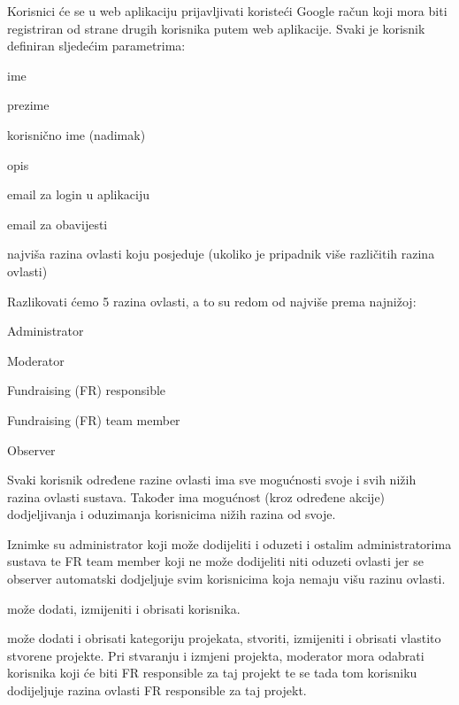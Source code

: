 		{Korisnici će se u web aplikaciju prijavljivati koristeći Google račun koji mora biti registriran od strane drugih korisnika putem web aplikacije. Svaki je korisnik definiran sljedećim parametrima:}
		\begin{packed_item}
			\item {ime}
			\item {prezime}
			\item {korisnično ime} (nadimak)
			\item {opis}
			\item {email za login u aplikaciju}
			\item {email za obavijesti}
			\item {najviša razina ovlasti koju posjeduje (ukoliko je pripadnik više različitih razina ovlasti)}
		\end{packed_item}
		
		{Razlikovati ćemo 5 razina ovlasti, a to su redom od najviše prema najnižoj:}
		\begin{packed_item}
			\item {Administrator}
			\item {Moderator}
			\item {Fundraising (FR) responsible}
			\item {Fundraising (FR) team member}
			\item {Observer}
		\end{packed_item}

		{Svaki korisnik određene razine ovlasti ima sve mogućnosti svoje i svih nižih razina ovlasti sustava. Također ima mogućnost (kroz određene akcije) dodjeljivanja i oduzimanja  korisnicima nižih razina od svoje.}

		{Iznimke su administrator koji može dodijeliti i oduzeti i ostalim administratorima sustava te FR team member koji ne može dodijeliti niti oduzeti ovlasti jer se observer automatski dodjeljuje svim korisnicima koja nemaju višu razinu ovlasti.}\vspace{0.3cm}
		
		
		{ može dodati, izmijeniti i obrisati korisnika.}\vspace{0.1cm}

		{ može dodati i obrisati kategoriju projekata, stvoriti, izmijeniti i obrisati vlastito stvorene projekte. Pri stvaranju i izmjeni projekta, moderator mora odabrati korisnika koji će biti FR responsible za taj projekt te se tada tom korisniku dodijeljuje razina ovlasti FR responsible za taj projekt.}\vspace{0.1cm}

